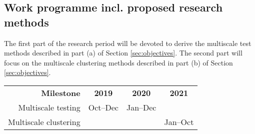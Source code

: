 \documentclass[a4paper,12pt]{article}
\begin{document}
\subsection{Work programme incl. proposed research methods}


The first part of the research period will be devoted to derive the multiscale test methods described in part (a) of Section \ref{sec:objectives}. The second part will focus on the multiscale clustering methods described in part (b) of Section \ref{sec:objectives}. 

\begin{center}
\begin{tabular}{r c c c}
{\bf Milestone} & {\bf 2019} & {\bf 2020} & {\bf 2021} \\
Multiscale testing & Oct--Dec & Jan--Dec & \\
Multiscale clustering & & & Jan--Oct
\end{tabular}
\end{center}









\end{document}
